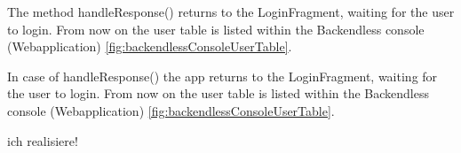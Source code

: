 \fbox{

}

The method handleResponse() returns to the LoginFragment, waiting for the user to login. From now on the user table is listed within the Backendless console (Webapplication) \ref{fig:backendlessConsoleUserTable}.



\fbox{

}

In case of handleResponse() the app returns to the LoginFragment, waiting for the user to login. From now on the user table is listed within the Backendless console (Webapplication) \ref{fig:backendlessConsoleUserTable}.



ich realisiere!